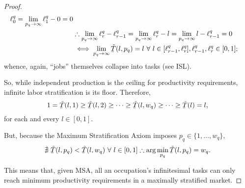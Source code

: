 \documentclass[hidelinks, nonatbib]{elsarticle}
\begin{document}
\begin{lemma}
\begin{proof}
\begin{align}
            \ell_{0}^{q}
            =
            \lim_{p_q \rightarrow \infty}
            \ell_{1}^{q} - 
            0
            = 0
            \\
            &
            \therefore
            \lim_{p_q \rightarrow \infty}{
                \ell_{r}^{q} - \ell_{r-1}^{q}
            }
            =
            \lim_{p_q \rightarrow \infty}{
                \ell_{r}^{q} - l
            }
            =
            \lim_{p_q \rightarrow \infty}{
                l - \ell_{r-1}^{q}
            }
            =
            0
            \\
            &
            \iff
            \lim_{p_q \rightarrow \infty}{
                \underaccent{\bar}{\tilde{T}}(l, p_q)
            }
            =
            l
            \
            \forall
            \
            l \in
            [\ell_{r-1}^{q}, \ell_{r}^{q}],
            \ell_{r-1}^{q}, \ell_{r}^{q}
            \in [0,1]
            ;
        \end{align}
        whence, again, ``jobs'' themselves collapse into tasks (see ISL).

        So, while independent production is the ceiling for productivity requirements, infinite labor stratification is its floor. Therefore,
        \begin{gather}
            1
            =
            \underaccent{\bar}{\tilde{T}}(l, 1)
            \geq
            \underaccent{\bar}{\tilde{T}}(l, 2)
            \geq
            \dots
            \geq
            \underaccent{\bar}{\tilde{T}}(l, w_q)
            \geq
            \dots
            \geq
            \underaccent{\bar}{\tilde{T}}(l)
            =
            l
            ,
        \end{gather}
        for each and every $l \in [0,1]$. 

        But, because the Maximum Stratification Axiom imposes $p_q \in \{1,\dots, w_q \}$,
        \begin{gather}
            \nexists \
            \underaccent{\bar}{\tilde{T}}(l, p_q)
            <
            \underaccent{\bar}{\tilde{T}}(l, w_q)
            \
            \forall
            \
            l \in [0,1]
            \therefore
            \arg\min_{p_q}{
                \underaccent{\bar}{\tilde{T}}(l, p_q)
            }
            = w_q
            .
        \end{gather}

        This means that, given MSA, all an occupation's infinitesimal tasks can only reach minimum productivity requirements in a maximally stratified  market.
    \end{proof}
\end{lemma}
\end{document}
